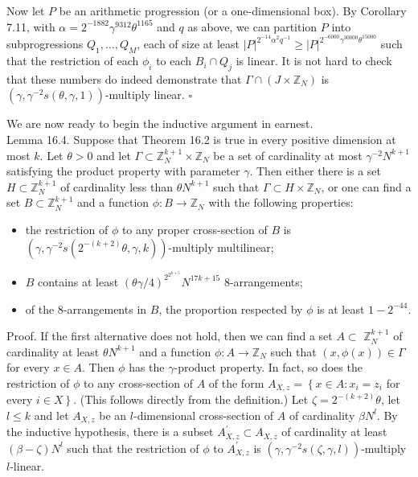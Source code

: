 \documentclass[10pt]{article}
\begin{document}
Now let $P$ be an arithmetic progression (or a one-dimensional box). By Corollary 7.11, with $\alpha=2^{-1882} \gamma^{9312} \theta^{1165}$ and $q$ as above, we can partition $P$ into subprogressions $Q_{1}, \ldots, Q_{M}$, each of size at least $|P|^{2^{-14} \alpha^{2} q^{-1}} \geqslant |P|^{2^{-6000}\gamma^{30000}\theta^{15000}}$ such that the restriction of each $\phi_{i}$ to each $B_{i} \cap Q_{j}$ is linear. It is not hard to check that these numbers do indeed demonstrate that $\Gamma \cap\left(J \times \mathbb{Z}_{N}\right)$ is $\left(\gamma, \gamma^{-2} s(\theta, \gamma, 1)\right)$-multiply linear. \(\square\)

We are now ready to begin the inductive argument in earnest.\\
Lemma 16.4. Suppose that Theorem 16.2 is true in every positive dimension at most $k$. Let $\theta>0$ and let $\Gamma \subset \mathbb{Z}_{N}^{k+1} \times \mathbb{Z}_{N}$ be a set of cardinality at most $\gamma^{-2} N^{k+1}$ satisfying the product property with parameter $\gamma$. Then either there is a set $H \subset \mathbb{Z}_{N}^{k+1}$ of cardinality less than $\theta N^{k+1}$ such that $\Gamma \subset H \times \mathbb{Z}_{N}$, or one can find a set $B \subset \mathbb{Z}_{N}^{k+1}$ and a function $\phi: B \rightarrow \mathbb{Z}_{N}$ with the following properties:

\begin{itemize}
  \item[(i)] the restriction of $\phi$ to any proper cross-section of $B$ is $\left(\gamma, \gamma^{-2} s\left(2^{-(k+2)} \theta, \gamma, k\right)\right)$-multiply multilinear;
  \item[(ii)] $B$ contains at least $(\theta \gamma / 4)^{2^{2^{k+5}}} N^{17 k+15}$ 8-arrangements;
  \item[(iii)] of the 8-arrangements in $B$, the proportion respected by $\phi$ is at least $1-2^{-44}$.
\end{itemize}

Proof. If the first alternative does not hold, then we can find a set $A \subset$ $\mathbb{Z}_{N}^{k+1}$ of cardinality at least $\theta N^{k+1}$ and a function $\phi: A \rightarrow \mathbb{Z}_{N}$ such that $(x, \phi(x)) \in \Gamma$ for every $x \in A$. Then $\phi$ has the $\gamma$-product property. In fact, so does the restriction of $\phi$ to any cross-section of $A$ of the form $A_{X, z}=\left\{x \in A: x_{i}=z_{i}\right.$ for every $\left.i \in X\right\}$. (This follows directly from the definition.) Let $\zeta=2^{-(k+2)} \theta$, let $l \leqslant k$ and let $A_{X, z}$ be an $l$-dimensional cross-section of $A$ of cardinality $\beta N^{l}$. By the inductive hypothesis, there is a subset $A_{X, z}^{\prime} \subset A_{X, z}$ of cardinality at least $(\beta-\zeta) N^{l}$ such that the restriction of $\phi$ to $A_{X, z}^{\prime}$ is $\left(\gamma, \gamma^{-2} s(\zeta, \gamma, l)\right)$-multiply $l$-linear.
\end{document}
